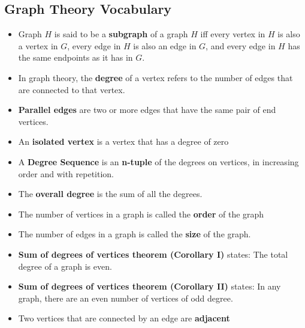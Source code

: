 \documentclass{report}
\begin{document}
      \subsection{Graph Theory Vocabulary}
      \bigbreak \noindent 
      \begin{itemize}
        \item Graph $H$ is said to be a \textbf{subgraph} of a graph $H$ iff every vertex in $H$ is also a vertex in $G$, every edge in $H$ is also an edge in $G$, and every edge in $H$ has the same endpoints as it has in $G$.
        \item In graph theory, the \textbf{degree} of a vertex refers to the number of edges that are connected to that vertex.
        \item \textbf{Parallel edges} are two or more edges that have the same pair of end vertices.
        \item An \textbf{isolated vertex} is a vertex that has a degree of zero
        \item A \textbf{Degree Sequence} is an \textbf{n-tuple} of the degrees on vertices, in increasing order and with repetition.
        \item The \textbf{overall degree} is the sum of all the degrees.
        \item The number of vertices in a graph is called the \textbf{order} of the graph
        \item The number of edges in a graph is called the \textbf{size} of the graph.
        \item \textbf{Sum of degrees of vertices theorem (Corollary I)} states: The total degree of a graph is even. 
        \item \textbf{Sum of degrees of vertices theorem (Corollary II)} states: In any graph, there are an even number of vertices of odd degree.
        \item Two vertices that are connected by an edge are  \textbf{adjacent}

\end{itemize}
\end{document}
